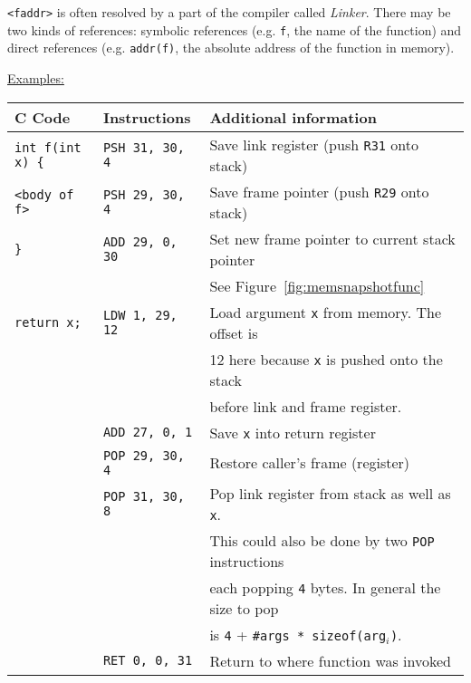 \par{
	\noindent
	\texttt{<faddr>} is often resolved by a part of the compiler called \textit{Linker}. There may be two kinds of references: symbolic references (e.g. \texttt{f}, the name of the function) and direct references (e.g. \texttt{addr(f)}, the absolute address of the function in memory).
}

\par{
	\noindent
    \underline{Examples:}
    \par{
        \noindent
        \begin{tabular}{lll}
            \hline
            C Code              		&   Instructions                &    Additional information                             			\\
            \hline
            \hline
            \rowcolor{blue!25}                
            \texttt{int f(int x) \{}	&   \texttt{PSH 31, 30, 4}     	&   Save link register (push \texttt{R31} onto stack)				\\
            \rowcolor{blue!25}
            \texttt{<body of f>}		&   \texttt{PSH 29, 30, 4}     	&   Save frame pointer (push \texttt{R29} onto stack)             	\\
            \rowcolor{blue!25}
			\texttt{\}}					&	\texttt{ADD 29, 0, 30}		&	Set new frame pointer to current stack pointer					\\
			\rowcolor{blue!25}
										&								&	See Figure~\ref{fig:memsnapshotfunc}							\\
            \rowcolor{green!25}
            \texttt{return x;}			&   \texttt{LDW 1, 29, 12}		&   Load argument \texttt{x} from memory. The offset is 			\\
            \rowcolor{green!25}
            							&   							&   12 here because \texttt{x} is pushed onto the stack 			\\
			\rowcolor{green!25}
										&								&	before link and frame register.									\\
			\rowcolor{green!25}
										&	\texttt{ADD 27, 0, 1}		&	Save \texttt{x} into return register							\\
			\rowcolor{green!25}
										&	\texttt{POP 29, 30, 4}		&	Restore caller's frame (register)								\\
			\rowcolor{green!25}
										&	\texttt{POP 31, 30, 8}		&	Pop link register from stack as well as \texttt{x}.				\\
			\rowcolor{green!25}
										&								&	This could also be done by two \texttt{POP} instructions		\\
			\rowcolor{green!25}
										&								&	each popping \texttt{4} bytes. In general the size to pop		\\
			\rowcolor{green!25}
										&								&	is \texttt{4} + \texttt{\#args * sizeof(arg$_i$)}.				\\
			\rowcolor{green!25}
										&	\texttt{RET 0, 0, 31}		&	Return to where function was invoked							\\
            \hline
        \end{tabular}
    }    
}

